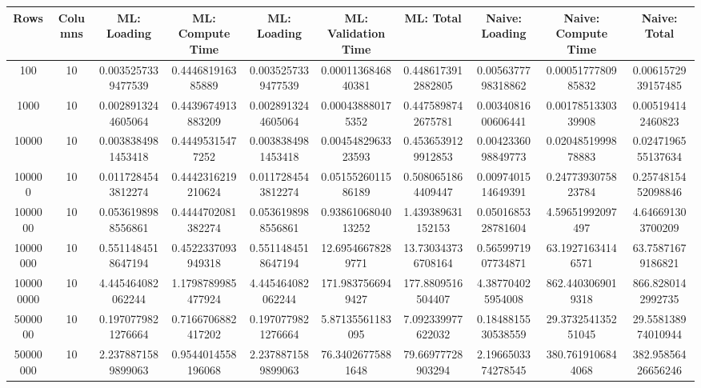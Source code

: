 \begin{table}[htb]
    \centering
    \begin{tabular}{@{}cccccccccc@{}}
        \toprule
        Rows & Columns & ML: Loading & ML: Compute Time & ML: Loading & ML: Validation Time & ML: Total & Naive: Loading & Naive: Compute Time & Naive: Total \\
        \midrule
        100 & 10 & 0.0035257339477539 & 0.444681916385889 & 0.0035257339477539 & 0.0001136846840381 & 0.4486173912882805 & 0.0056377798318862 & 0.0005177780985832 & 0.0061572939157485 \\
        1000 & 10 & 0.0028913244605064 & 0.4439674913883209 & 0.0028913244605064 & 0.000438880175352 & 0.4475898742675781 & 0.0034081600606441 & 0.0017851330339908 & 0.005194142460823 \\
        10000 & 10 & 0.0038384981453418 & 0.44495315477252 & 0.0038384981453418 & 0.0045482963323593 & 0.4536539129912853 & 0.0042336098849773 & 0.0204851999878883 & 0.0247196555137634 \\
        100000 & 10 & 0.0117284543812274 & 0.4442316219210624 & 0.0117284543812274 & 0.0515526011586189 & 0.5080651864409447 & 0.0097401514649391 & 0.2477393075823784 & 0.2574815452098846 \\
        1000000 & 10 & 0.0536198988556861 & 0.4444702081382274 & 0.0536198988556861 & 0.9386106804013252 & 1.439389631152153 & 0.0501685328781604 & 4.59651992097497 & 4.646691303700209 \\
        10000000 & 10 & 0.5511484518647194 & 0.4522337093949318 & 0.5511484518647194 & 12.69546678289771 & 13.730343736708164 & 0.5659971907734871 & 63.19271634146571 & 63.75871679186821 \\
        100000000 & 10 & 4.445464082062244 & 1.1798789985477924 & 4.445464082062244 & 171.9837566949427 & 177.8809516504407 & 4.387704025954008 & 862.4403069019318 & 866.8280142992735 \\
        5000000 & 10 & 0.1970779821276664 & 0.7166706882417202 & 0.1970779821276664 & 5.87135561183095 & 7.092339977622032 & 0.1848815530538559 & 29.373254135251045 & 29.558138974010944 \\
        50000000 & 10 & 2.2378871589899063 & 0.9544014558196068 & 2.2378871589899063 & 76.34026775881648 & 79.66977728903294 & 2.1966503374278545 & 380.7619106844068 & 382.95856426656246 \\
        \bottomrule
    \end{tabular}
\end{table}